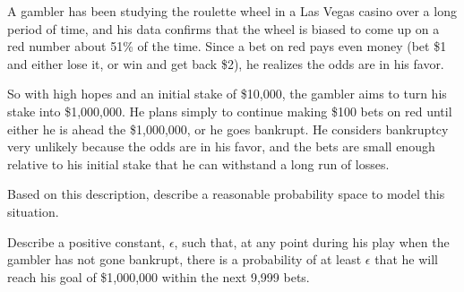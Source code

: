 

\begin{problem}
A gambler has been studying the roulette wheel in a Las Vegas casino over
a long period of time, and his data confirms that the wheel is biased to
come up on a red number about 51\% of the time.  Since a bet on red pays
even money (bet \$1 and either lose it, or win and get back \$2), he
realizes the odds are in his favor.

So with high hopes and an initial stake of \$10,000, the gambler aims to
turn his stake into \$1,000,000.  He plans simply to continue making \$100
bets on red until either he is ahead the \$1,000,000, or he goes bankrupt.
He considers bankruptcy very unlikely because the odds are in his favor,
and the bets are small enough relative to his initial stake that he can
withstand a long run of losses.

\bparts

\ppart 
Based on this description, describe a reasonable probability space to
model this situation.


\ppart Describe a positive constant, $\epsilon$, such that, at any point
during his play when the gambler has not gone bankrupt, there is a
probability of at least $\epsilon$ that he will reach his goal of
\$1,000,000 within the next 9,999 bets.


\end{problem}

